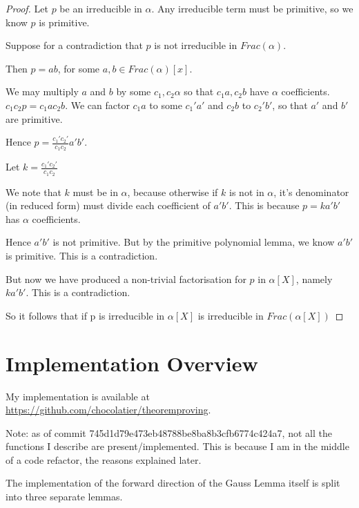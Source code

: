 \documentclass[pagesize=a4]{scrreprt}
\begin{document}
  \begin{proof}

    Let $p$ be an irreducible in $\alpha$. Any irreducible term must be primitive, so we know $p$ is primitive. 

    Suppose for a contradiction that $p$ is not irreducible in $Frac (\alpha)$. 

    Then $p = ab$, for some $a,b \in Frac (\alpha)[x]$. 

    We may multiply $a$ and $b$ by some $c_1,c_2 \alpha$ so that $c_1a,c_2b$ have $\alpha$ coefficients. $c_1c_2p = c_1ac_2b$. 
    We can factor $c_1a$ to some $c_1'a'$ and $c_2b$ to $c_2'b'$, so that $a'$ and $b'$ are primitive. 

    Hence $p = \frac{c_1'c_2'}{c_1c_2}a'b'$.

    Let $k =  \frac{c_1'c_2'}{c_1c_2}$

    We note that $k$ must be in $\alpha$, because otherwise 
if $k$ is not in $\alpha$, it's denominator (in reduced form) must divide each coefficient of $a'b'$. This is because $p =  ka'b'$ has $\alpha$ coefficients. 
  
    Hence $a'b'$ is not primitive. But by the primitive polynomial lemma, we know $a'b'$ is primitive. This is a contradiction. 

    But now we have produced a non-trivial factorisation for $p$ in $\alpha[X]$, namely $ka'b'$. This is a contradiction. 
    
    So it follows that if p is irreducible in  $\alpha[X]$ is irreducible in $Frac(\alpha[X])$


  \end{proof}


\chapter{Implementation Overview} 

My implementation is available at \url{https://github.com/chocolatier/theoremproving}. 

Note: as of commit 745d1d79e473eb48788be8ba8b3cfb6774c424a7, not all the functions I describe are present/implemented. This is because I am in the middle of a code refactor, the reasons explained later. 

The implementation of the forward direction of the Gauss Lemma itself is split into three separate lemmas. 
\end{document}
